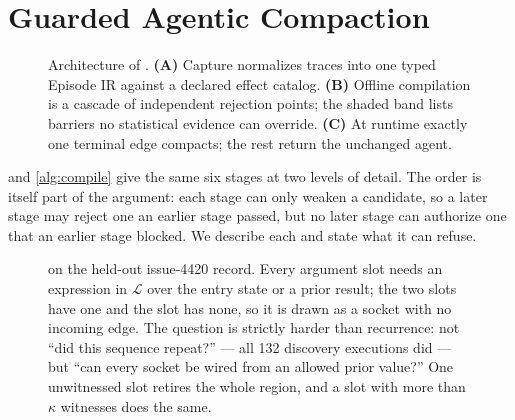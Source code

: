 \section{Guarded Agentic Compaction}
\label{sec:method}

\begin{figure}[t]
  \centering
  
  \caption{Architecture of \method. \textbf{(A)} Capture normalizes traces into
  one typed Episode IR against a declared effect catalog. \textbf{(B)} Offline
  compilation is a cascade of independent rejection points; the shaded band
  lists barriers no statistical evidence can override. \textbf{(C)} At runtime
  exactly one terminal edge compacts; the rest return the unchanged agent.}
  \label{fig:pipeline}
\end{figure}



 and \cref{alg:compile} give the same six stages at two
levels of detail. The order is itself part of the argument: each stage can only
weaken a candidate, so a later stage may reject one an earlier stage passed, but
no later stage can authorize one that an earlier stage blocked. We describe each and
state what it can refuse.

\begin{figure}[t]
  \centering
  
  \caption{ on the held-out issue-4420 record. Every argument
  slot needs an expression in $\mathcal{L}$ over the entry state or a prior
  result; the two  slots have one and the  slot
  has none, so it is drawn as a socket with no incoming edge. The question is
  strictly harder than recurrence: not ``did this sequence repeat?'' --- all 132
  discovery executions did --- but ``can every socket be wired from an allowed
  prior value?'' One unwitnessed slot retires the whole region, and a slot with
  more than $\kappa$ witnesses does the same.}
  \label{fig:provenance}
\end{figure}


